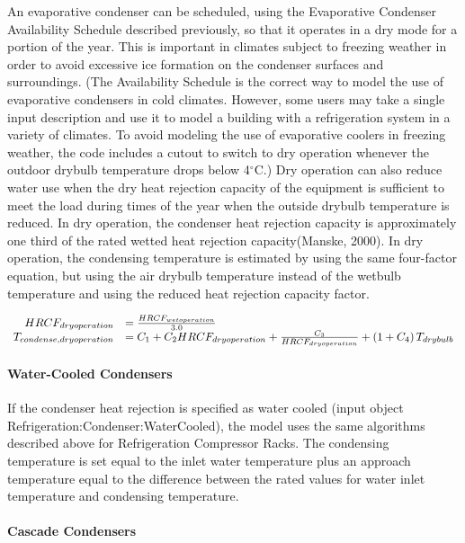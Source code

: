 An evaporative condenser can be scheduled, using the Evaporative Condenser Availability Schedule described previously, so that it operates in a dry mode for a portion of the year. This is important in climates subject to freezing weather in order to avoid excessive ice formation on the condenser surfaces and surroundings. (The Availability Schedule is the correct way to model the use of evaporative condensers in cold climates. However, some users may take a single input description and use it to model a building with a refrigeration system in a variety of climates. To avoid modeling the use of evaporative coolers in freezing weather, the code includes a cutout to switch to dry operation whenever the outdoor drybulb temperature drops below 4\(^{\circ}\)C.) Dry operation can also reduce water use when the dry heat rejection capacity of the equipment is sufficient to meet the load during times of the year when the outside drybulb temperature is reduced. In dry operation, the condenser heat rejection capacity is approximately one third of the rated wetted heat rejection capacity(Manske, 2000). In dry operation, the condensing temperature is estimated by using the same four-factor equation, but using the air drybulb temperature instead of the wetbulb temperature and using the reduced heat rejection capacity factor.

\begin{equation}
  \begin{array}{rl}
    HRCF_{dry operation} &= \frac{HRCF_{wet operation}}{3.0} \\
    T_{condense,dry operation} &= {C_1} + {C_2}{HRCF_{dry operation}} + \frac{C_3}{HRCF_{dry operation}} + \left(1 + C_4\right) T_{drybulb}
  \end{array}
\end{equation}

\paragraph{Water-Cooled Condensers}\label{water-cooled-condensers}

If the condenser heat rejection is specified as water cooled (input object Refrigeration:Condenser:WaterCooled), the model uses the same algorithms described above for Refrigeration Compressor Racks. The condensing temperature is set equal to the inlet water temperature plus an approach temperature equal to the difference between the rated values for water inlet temperature and condensing temperature.

\paragraph{Cascade Condensers}\label{cascade-condensers}


